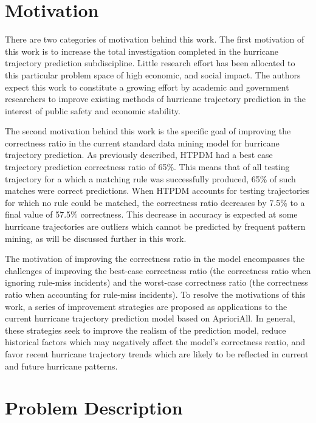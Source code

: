 \documentclass[12pt,conference]{IEEEtran}
\begin{document}

\section{Motivation}

There are two categories of motivation behind this work. The first motivation of this work is to increase the total investigation completed in the hurricane trajectory prediction subdiscipline. Little research effort has been allocated to this particular problem space of high economic, and social impact. The authors expect this work to constitute a growing effort by academic and government researchers to improve existing methods of hurricane trajectory prediction in the interest of public safety and economic stability.

The second motivation behind this work is the specific goal of improving the correctness ratio in the current standard data mining model for hurricane trajectory prediction. As previously described, HTPDM had a best case trajectory prediction correctness ratio of 65\%. This means that of all testing trajectory for a which a matching rule was successfully produced, 65\% of such matches were correct predictions. When HTPDM accounts for testing trajectories for which no rule could be matched, the correctness ratio decreases by 7.5\% to a final value of 57.5\% correctness. This decrease in accuracy is expected at some hurricane trajectories are outliers which cannot be predicted by frequent pattern mining, as will be discussed further in this work.

The motivation of improving the correctness ratio in the model encompasses the challenges of improving the best-case correctness ratio (the correctness ratio when ignoring rule-miss incidents) and the worst-case correctness ratio (the correctness ratio when accounting for rule-miss incidents). To resolve the motivations of this work, a series of improvement strategies are proposed as applications to the current hurricane trajectory prediction model based on AprioriAll. In general, these strategies seek to improve the realism of the prediction model, reduce historical factors which may negatively affect the model's correctness reatio, and favor recent hurricane trajectory trends which are likely to be reflected in current and future hurricane patterns.

\section{Problem Description}
\end{document}
